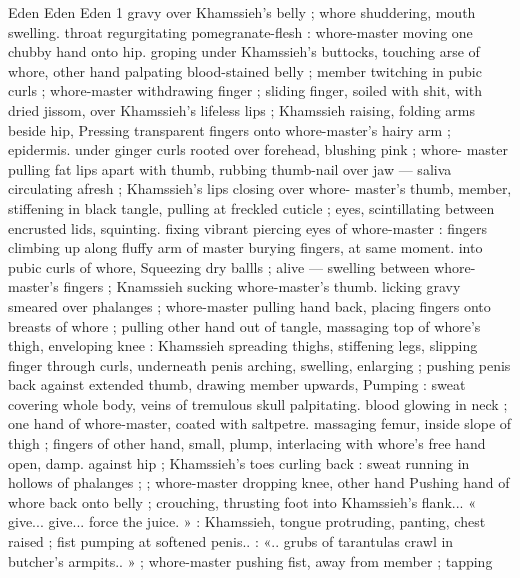 Eden Eden Eden 1
gravy over Khamssieh's belly ; whore shuddering, mouth swelling.
throat regurgitating pomegranate-flesh : whore-master moving one
chubby hand onto hip. groping under Khamssieh’s buttocks, touching
arse of whore, other hand palpating blood-stained belly ; member
twitching in pubic curls ; whore-master withdrawing finger ; sliding
finger, soiled with shit, with dried jissom, over Khamssieh’s lifeless
lips ; Khamssieh raising, folding arms beside hip, Pressing
transparent fingers onto whore-master's hairy arm ; epidermis.
under ginger curls rooted over forehead, blushing pink ; whore-
master pulling fat lips apart with thumb, rubbing thumb-nail over jaw
— saliva circulating afresh ; Khamssieh's lips closing over whore-
master's thumb, member, stiffening in black tangle, pulling at
freckled cuticle ; eyes, scintillating between encrusted lids, squinting.
fixing vibrant piercing eyes of whore-master : fingers climbing up
along fluffy arm of master burying fingers, at same moment. into
pubic curls of whore, Squeezing dry ballls ; alive — swelling between
whore-master's fingers ; Knamssieh sucking whore-master's thumb.
licking gravy smeared over phalanges ; whore-master pulling hand
back, placing fingers onto breasts of whore ; pulling other hand out
of tangle, massaging top of whore's thigh, enveloping knee :
Khamssieh spreading thighs, stiffening legs, slipping finger through
curls, underneath penis arching, swelling, enlarging ; pushing penis
back against extended thumb, drawing member upwards, Pumping :
sweat covering whole body, veins of tremulous skull palpitating.
blood glowing in neck ; one hand of whore-master, coated with
saltpetre. massaging femur, inside slope of thigh ; fingers of other
hand, small, plump, interlacing with whore's free hand open, damp.
against hip ; Khamssieh's toes curling back : sweat running in
hollows of phalanges ; ; whore-master dropping knee, other hand
Pushing hand of whore back onto belly ; crouching, thrusting foot
into Khamssieh's flank... « give... give... force the juice. » :
Khamssieh, tongue protruding, panting, chest raised ; fist pumping
at softened penis.. : «.. grubs of tarantulas crawl in butcher's
armpits.. » ; whore-master pushing fist, away from member ; tapping

